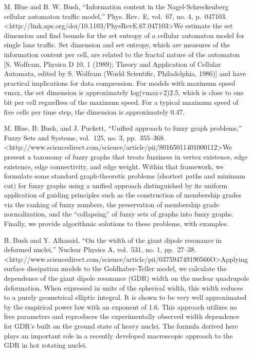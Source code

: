 \documentclass[]{article}
\begin{document}
M. Blue and B. W. Bush, ``Information content in the Nagel-Schreckenberg
cellular automaton traffic model,'' Phys. Rev.~E, vol.~67, no. 4,
p.~047103.
\textless{}http://link.aps.org/doi/10.1103/PhysRevE.67.047103\textgreater{}We
estimate the set dimension and find bounds for the set entropy of a
cellular automaton model for single lane traffic. Set dimension and set
entropy, which are measures of the information content per cell, are
related to the fractal nature of the automaton {[}S. Wolfram, Physica D
10, 1 (1989); Theory and Application of Cellular Automata, edited by S.
Wolfram (World Scientific, Philadelphia, 1986){]} and have practical
implications for data compression. For models with maximum speed vmax,
the set dimension is approximately log(vmax+2)2.5, which is close to one
bit per cell regardless of the maximum speed. For a typical maximum
speed of five cells per time step, the dimension is approximately 0.47.

M. Blue, B. Bush, and J. Puckett, ``Unified approach to fuzzy graph
problems,'' Fuzzy Sets and Systems, vol.~125, no. 3, pp.~355--368.
\textless{}http://www.sciencedirect.com/science/article/pii/S0165011401000112\textgreater{}We
present a taxonomy of fuzzy graphs that treats fuzziness in vertex
existence, edge existence, edge connectivity, and edge weight. Within
that framework, we formulate some standard graph-theoretic problems
(shortest paths and minimum cut) for fuzzy graphs using a unified
approach distinguished by its uniform application of guiding principles
such as the construction of membership grades via the ranking of fuzzy
numbers, the preservation of membership grade normalization, and the
``collapsing'' of fuzzy sets of graphs into fuzzy graphs. Finally, we
provide algorithmic solutions to these problems, with examples.

B. Bush and Y. Alhassid, ``On the width of the giant dipole resonance in
deformed nuclei,'' Nuclear Physics A, vol.~531, no. 1, pp.~27--38.
\textless{}http://www.sciencedirect.com/science/article/pii/037594749190566O\textgreater{}Applying
surface dissipation models to the Goldhaber-Teller model, we calculate
the dependence of the giant dipole resonance (GDR) width on the nuclear
quadrupole deformation. When expressed in units of the spherical width,
this width reduces to a purely geometrical elliptic integral. It is
shown to be very well approximated by the empirical power law with an
exponent of 1.6. This approach utilizes no free parameters and
reproduces the experimentally observed width dependence for GDR's built
on the ground state of heavy nuclei. The formula derived here plays an
important role in a recently developed macroscopic approach to the GDR
in hot rotating nuclei.
\end{document}
